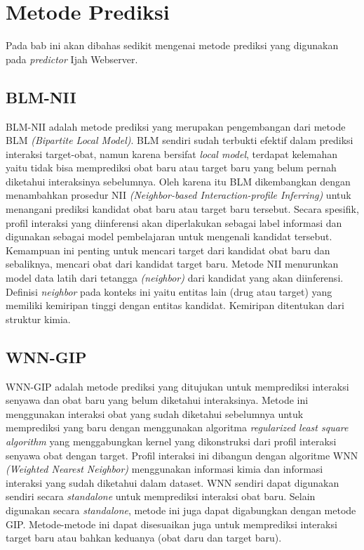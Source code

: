 \chapter{Metode Prediksi} \label{chap:prediksi}

Pada bab ini akan dibahas sedikit mengenai metode prediksi yang digunakan pada \emph{predictor} Ijah Webserver.

\section{BLM-NII}
BLM-NII adalah metode prediksi yang merupakan pengembangan dari metode BLM \emph{(Bipartite Local Model)}. BLM sendiri sudah terbukti efektif dalam prediksi interaksi target-obat, namun karena bersifat \emph{local model}, terdapat kelemahan yaitu tidak bisa memprediksi obat baru atau target baru yang belum pernah diketahui interaksinya sebelumnya. Oleh karena itu BLM dikembangkan dengan menambahkan prosedur NII \emph{(Neighbor-based Interaction-profile Inferring)} untuk menangani prediksi kandidat obat baru atau target baru tersebut. Secara spesifik, profil interaksi yang diinferensi akan diperlakukan sebagai label informasi dan digunakan sebagai model pembelajaran untuk mengenali kandidat tersebut. Kemampuan ini penting untuk mencari target dari kandidat obat baru dan sebaliknya, mencari obat dari kandidat target baru. Metode NII menurunkan model data latih dari tetangga \emph{(neighbor)} dari kandidat yang akan diinferensi. Definisi \emph{neighbor} pada konteks ini yaitu entitas lain (drug atau target) yang memiliki kemiripan tinggi dengan entitas kandidat. Kemiripan ditentukan dari struktur kimia.

\section{WNN-GIP}
WNN-GIP adalah metode prediksi yang ditujukan untuk memprediksi interaksi senyawa dan obat baru yang belum diketahui interaksinya. Metode ini menggunakan interaksi obat yang sudah diketahui sebelumnya untuk memprediksi yang baru dengan menggunakan algoritma \emph{regularized least square algorithm} yang menggabungkan kernel yang dikonstruksi dari profil interaksi senyawa obat dengan target. Profil interaksi ini dibangun dengan algoritme WNN \emph{(Weighted Nearest Neighbor)} menggunakan informasi kimia dan informasi interaksi yang sudah diketahui dalam dataset. WNN sendiri dapat digunakan sendiri secara \emph{standalone} untuk memprediksi interaksi obat baru. Selain digunakan secara \emph{standalone}, metode ini juga dapat digabungkan dengan metode GIP. Metode-metode ini dapat disesuaikan juga untuk memprediksi interaksi target baru atau bahkan keduanya (obat daru dan target baru).